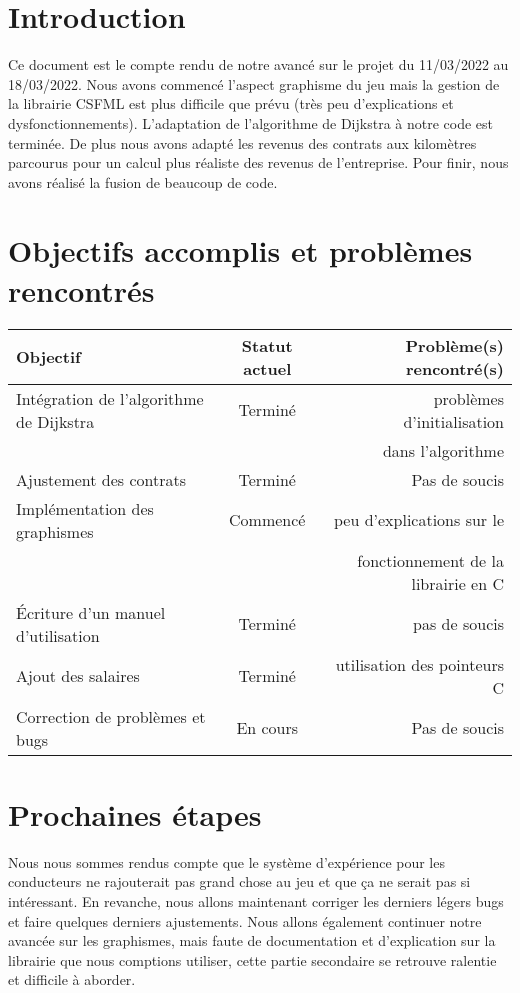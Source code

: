 \documentclass[a4paper, 12pt]{article}
\begin{document}
\newpage



\section*{Introduction}
      Ce document est le compte rendu de notre avancé sur le projet du 11/03/2022 au 18/03/2022. Nous avons commencé l'aspect graphisme du jeu mais la gestion de la librairie CSFML est plus difficile que prévu (très peu d'explications et dysfonctionnements). L'adaptation de l'algorithme de Dijkstra à notre code est terminée. De plus nous avons adapté les revenus des contrats aux kilomètres parcourus pour un calcul plus réaliste des revenus de l'entreprise. Pour finir, nous avons réalisé la fusion de beaucoup de code.

\section{Objectifs accomplis et problèmes rencontrés}
     \begin{tabular}{|l|c|r|}
  \hline
  Objectif & Statut actuel & Problème(s) rencontré(s) \\
  \hline
   Intégration de l'algorithme de Dijkstra & Terminé & problèmes d'initialisation \\
   & & dans l'algorithme\\
   Ajustement des contrats & Terminé & Pas de soucis\\
   Implémentation des graphismes & Commencé & peu d'explications sur le \\
   & & fonctionnement de la librairie en C\\
   Écriture d'un manuel d'utilisation & Terminé & pas de soucis\\
   Ajout des salaires & Terminé & utilisation des pointeurs C\\
   Correction de problèmes et bugs & En cours & Pas de soucis\\
   
  \hline
\end{tabular}

\HRule

\section{Prochaines étapes}
    Nous nous sommes rendus compte que le système d'expérience pour les conducteurs ne rajouterait pas grand chose au jeu et que ça ne serait pas si intéressant. En revanche, nous allons maintenant corriger les derniers légers bugs et faire quelques derniers ajustements. Nous allons également continuer notre avancée sur les graphismes, mais faute de documentation et d'explication sur la librairie que nous comptions utiliser, cette partie secondaire se retrouve ralentie et difficile à aborder. 
    
\end{document}
